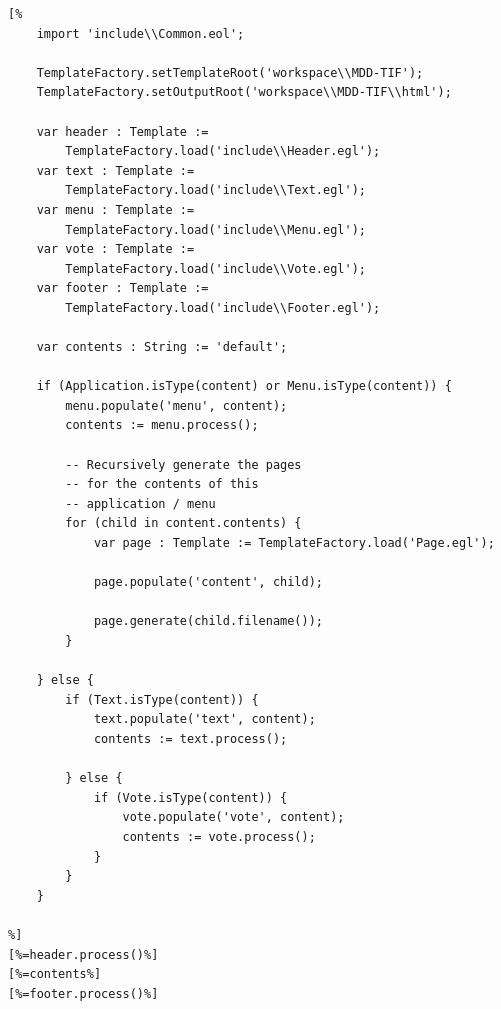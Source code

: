 \begin{lstlisting}[basicstyle=\ttfamily\footnotesize, nolol=true, flexiblecolumns=true, caption=EGL template that generates mockup HTML screens for a TVApp model, tabsize=2, label=lst:Mockup, language=EOL]
[%
	import 'include\\Common.eol';

	TemplateFactory.setTemplateRoot('workspace\\MDD-TIF');
	TemplateFactory.setOutputRoot('workspace\\MDD-TIF\\html');
	
	var header : Template := 
		TemplateFactory.load('include\\Header.egl');
	var text : Template := 
		TemplateFactory.load('include\\Text.egl');	
	var menu : Template := 
		TemplateFactory.load('include\\Menu.egl');
	var vote : Template := 
		TemplateFactory.load('include\\Vote.egl');
	var footer : Template := 
		TemplateFactory.load('include\\Footer.egl');
	
	var contents : String := 'default';
	
	if (Application.isType(content) or Menu.isType(content)) {
		menu.populate('menu', content);
		contents := menu.process();
		
		-- Recursively generate the pages 
		-- for the contents of this
		-- application / menu
		for (child in content.contents) {
			var page : Template := TemplateFactory.load('Page.egl');
		
			page.populate('content', child);
			
			page.generate(child.filename());
		}

	} else {
		if (Text.isType(content)) {
			text.populate('text', content);
			contents := text.process();

		} else {
			if (Vote.isType(content)) {
				vote.populate('vote', content);
				contents := vote.process();
			}
		}
	}
	
%]
[%=header.process()%]
[%=contents%]
[%=footer.process()%]
\end{lstlisting}



